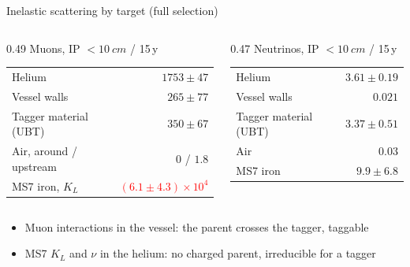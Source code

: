 \documentclass[aspectratio=149,11pt]{beamer}
\newcommand{\pend}[1]{\textcolor{red}{#1}}
\begin{document}
\begin{frame}{Inelastic scattering by target (full selection)}
  \begin{columns}[T]
    \begin{column}{0.49\textwidth}
      \footnotesize
      Muons, IP $< \SI{10}{cm}$ / 15\,y\\[2pt]
      \begin{tabular}{@{}lr@{}}
        \toprule
        Helium               & $1753 \pm 47$ \\
        Vessel walls         & $265 \pm 77$ \\
        Tagger material (UBT) & $350 \pm 67$ \\
        Air, around / upstream & 0 / $1.8$ \\
        MS7 iron, $K_L$       & \pend{$(6.1 \pm 4.3)\times10^{4}$} \\
        \bottomrule
      \end{tabular}
    \end{column}
    \begin{column}{0.47\textwidth}
      \footnotesize
      Neutrinos, IP $< \SI{10}{cm}$ / 15\,y\\[2pt]
      \begin{tabular}{@{}lr@{}}
        \toprule
        Helium               & $3.61 \pm 0.19$ \\
        Vessel walls         & $0.021$ \\
        Tagger material (UBT) & $3.37 \pm 0.51$ \\
        Air                  & $0.03$ \\
        MS7 iron             & $9.9 \pm 6.8$ \\
        \bottomrule
      \end{tabular}
    \end{column}
  \end{columns}
  \vspace{0.3cm}
  \begin{itemize}\small
    \item Muon interactions in the vessel: the parent crosses the tagger, taggable
    \item MS7 $K_L$ and $\nu$ in the helium: no charged parent, irreducible for a tagger
  \end{itemize}
\end{frame}
\end{document}
